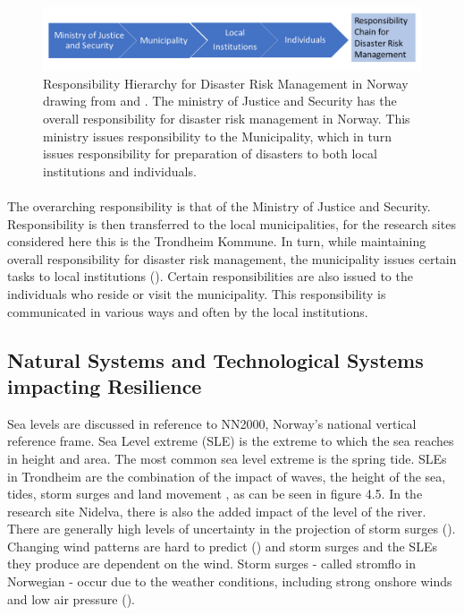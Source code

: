 \begin{figure} [h]
    \centering
    \includegraphics[width=1\textwidth]{fig_theory/responsibility drm.png}
    \caption{Responsibility Hierarchy for Disaster Risk Management in Norway drawing from \cite{rasanen_conceptualizing_2020} and \cite{hanssen_saksframlegg_2013}. The ministry of Justice and Security has the overall responsibility for disaster risk management in Norway. This ministry issues responsibility to the Municipality, which in turn issues responsibility for preparation of disasters to both local institutions and individuals. }
    \label{fig:drm_responsibility}
\end{figure}
\paragraph{}
The overarching responsibility is that of the Ministry of Justice and Security. Responsibility is then transferred to the local municipalities, for the research sites considered here this is the Trondheim Kommune. In turn, while maintaining overall responsibility for disaster risk management, the municipality issues certain tasks to local institutions (\cite{hanssen_saksframlegg_2013}). Certain responsibilities are also issued to the individuals who reside or visit the municipality. This responsibility is communicated in various ways and often by the local institutions. 





\subsection{Natural Systems and Technological Systems impacting Resilience }
Sea levels are discussed in reference to NN2000, Norway's national vertical reference frame. Sea Level extreme (SLE) is the extreme to which the sea reaches in height and area. The most common sea level extreme is the spring tide. SLEs in Trondheim are the combination of the impact of waves, the height of the sea, tides, storm surges and land movement \cite{hanssen-bauer_climate_2017}, as can be seen in figure 4.5. In the research site Nidelva, there is also the added impact of the level of the river. There are generally high levels of uncertainty in the projection of storm surges (\cite{nilsen_sealevelchangefornorway_nodate}). Changing wind patterns are hard to predict (\cite{rod_three_2015}) and storm surges and the SLEs they produce are dependent on the wind. Storm surges - called stromflo in Norwegian -  occur due to the weather conditions, including strong onshore winds and low air pressure (\cite{hanssen_saksframlegg_2013}). 

